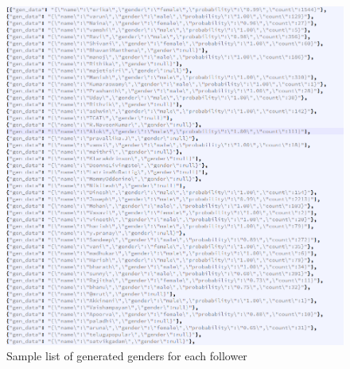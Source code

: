 \begin{figure}[ht]    
    \begin{center}
        \includegraphics[scale=0.7]{sampe_gen_data.png}
        \caption{Sample list of generated genders for each follower}
        \label{Sample_t1}
    \end{center}
\end{figure}
\newpage
